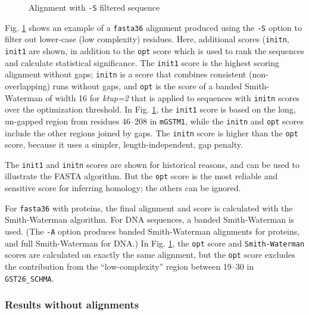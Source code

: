 \documentclass[11pt]{article}
\begin{document}
\begin{figure}

\vspace{-3.0ex}
\caption{\label{seg-aln}Alignment with \texttt{-S} filtered sequence}
\end{figure}

Fig. \ref{seg-aln} shows an example of a \texttt{fasta36} alignment
produced using the \texttt{-S} option to filter out lower-case (low
complexity) residues.  Here, additional scores (\texttt{initn},
\texttt{init1} are shown, in addition to the \texttt{opt} score which
is used to rank the sequences and calculate statistical significance.
The \texttt{init1} score is the highest scoring alignment without
gaps; \texttt{initn} is a score that combines consistent
(non-overlapping) runs without gaps, and \texttt{opt} is the score of
a banded Smith-Waterman of width 16 for \emph{ktup=2} that is applied
to sequences with \texttt{initn} scores over the optimization
threshold. In Fig. \ref{seg-aln},  the \texttt{init1} score is
based on the long, un-gapped region from residues 46--208 in
\texttt{mGSTM1}, while the \texttt{initn} and \texttt{opt} scores
include the other regions joined by gaps.  The \texttt{initn} score is
higher than the \texttt{opt} score, because it uses a simpler,
length-independent, gap penalty.

The \texttt{init1} and \texttt{initn} scores are shown for
historical reasons, and can be used to illustrate the FASTA algorithm.
But the \texttt{opt} score is the most reliable and sensitive score
for inferring homology; the others can be ignored.

For \texttt{fasta36} with proteins, the final alignment and score is
calculated with the Smith-Waterman algorithm. For DNA sequences, a
banded Smith-Waterman is used. (The \texttt{-A} option produces banded
Smith-Waterman alignments for proteins, and full Smith-Waterman for
DNA.)  In Fig. \ref{seg-aln}, the \texttt{opt} score and
\texttt{Smith-Waterman} scores are calculated on exactly the same
alignment, but the \texttt{opt} score excludes the contribution from
the ``low-complexity'' region between 19--30 in \texttt{GST26\_SCHMA}.

\subsubsection{Results without alignments}
\end{document}

